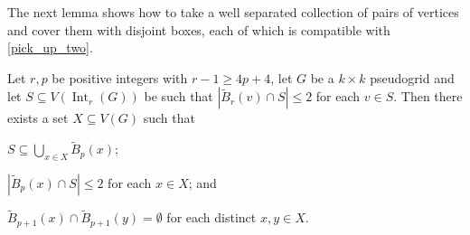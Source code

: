 \documentclass{patmorin}
\DeclareMathOperator{\interior}{Int}
\begin{document}
The next lemma shows how to take a well separated collection of pairs of vertices and cover them with disjoint boxes, each of which is compatible with \cref{pick_up_two}.

\begin{lem}\label{make_disjoint}
  Let $r,p$ be positive integers with $r-1\ge 4p+4$, let $G$ be a $k\times k$ pseudogrid and let $S\subseteq V(\interior_r(G))$ be such that $|\tilde{B}_{r}(v)\cap S|\le 2$ for each $v\in S$.
  Then there exists a set $X\subseteq V(G)$ such that
  \begin{compactenum}[(i)]
    \item \label{covers_s} $S\subseteq\bigcup_{x\in X}\tilde{B}_{p}(x)$;
    \item \label{two_per_box} $|\tilde{B}_{p}(x)\cap S|\le 2$ for each $x\in X$; and
    \item \label{disjoint_boxes} $\tilde{B}_{p+1}(x)\cap \tilde{B}_{p+1}(y)=\emptyset$ for each distinct $x,y\in X$.
  \end{compactenum}
\end{lem}
\end{document}
